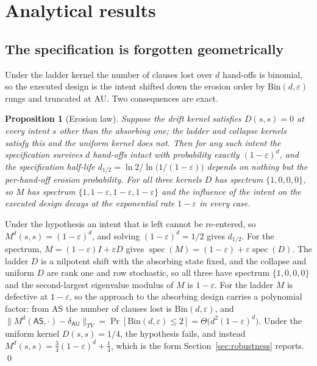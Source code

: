 \documentclass[a4paper,fleqn]{cas-sc}
\newtheorem{proposition}[theorem]{Proposition}
\newcommand{\AS}{\textsf{AS}}
\newcommand{\AU}{\textsf{AU}}
\begin{document}
\section{Analytical results}
\label{sec:analysis}

\subsection{The specification is forgotten geometrically}
\label{sec:erosion}

Under the ladder kernel the number of clauses lost over $d$ hand-offs is
binomial, so the executed design is the intent shifted down the erosion order
by $\mathrm{Bin}(d,\varepsilon)$ rungs and truncated at \AU{}. Two consequences
are exact.

\begin{proposition}[Erosion law]
\label{prop:erosion}
Suppose the drift kernel satisfies $D(s,s)=0$ at every intent $s$ other than
the absorbing one; the ladder and collapse kernels satisfy this and the uniform
kernel does not. Then for any such intent the specification survives $d$
hand-offs intact with probability exactly $(1-\varepsilon)^{d}$, and the
\emph{specification half-life}
$d_{1/2}=\ln2/\ln\bigl(1/(1-\varepsilon)\bigr)$ depends on nothing but the
per-hand-off erosion probability. For all three kernels $D$ has spectrum
$\{1,0,0,0\}$, so $M$ has spectrum $\{1,1-\varepsilon,1-\varepsilon,
1-\varepsilon\}$ and the influence of the intent on the executed design decays
at the exponential rate $1-\varepsilon$ in every case.
\end{proposition}

\begin{pf}
Under the hypothesis an intent that is left cannot be re-entered, so
$M^{d}(s,s)=(1-\varepsilon)^{d}$, and solving $(1-\varepsilon)^{d}=1/2$ gives
$d_{1/2}$. For the spectrum, $M=(1-\varepsilon)I+\varepsilon D$ gives
$\operatorname{spec}(M)=(1-\varepsilon)+\varepsilon\operatorname{spec}(D)$. The
ladder $D$ is a nilpotent shift with the absorbing state fixed, and the
collapse and uniform $D$ are rank one and row stochastic, so all three have
spectrum $\{1,0,0,0\}$ and the second-largest eigenvalue modulus of $M$ is
$1-\varepsilon$. For the ladder $M$ is defective at $1-\varepsilon$, so the
approach to the absorbing design carries a polynomial factor: from \AS{} the
number of clauses lost is $\mathrm{Bin}(d,\varepsilon)$, and
$\lVert M^{d}(\AS{},\cdot)-\delta_{\AU{}}\rVert_{TV}=\Pr[\mathrm{Bin}
(d,\varepsilon)\le2]=\Theta\bigl(d^{2}(1-\varepsilon)^{d}\bigr)$.
Under the uniform kernel $D(s,s)=1/4$, the hypothesis fails,
and instead $M^{d}(s,s)=\tfrac34(1-\varepsilon)^{d}+\tfrac14$, which is the
form Section~\ref{sec:robustness} reports.
\qed
\end{pf}
\end{document}
